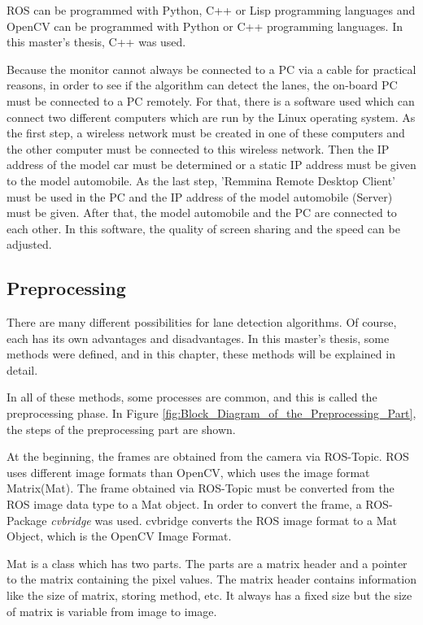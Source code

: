 ROS can be programmed with Python, C++ or Lisp programming languages and OpenCV can be programmed with Python or C++ programming languages. In this master's thesis, C++ was used.

Because the monitor cannot always be connected to a PC via a cable for practical reasons, in order to see if the algorithm can detect the lanes, the on-board PC must be connected to a PC remotely. For that, there is a software used which can connect two different computers which are run by the Linux operating system. As the first step, a wireless network must be created in one of these computers and the other computer must be connected to this wireless network. Then the IP address of the model car must be determined or a static IP address must be given to the model automobile. As the last step, 'Remmina Remote Desktop Client' must be used in the PC and the IP address of the model automobile (Server) must be given. After that, the model automobile and the PC are connected to each other. In this software, the quality of screen sharing and the speed can be adjusted.  

%
\subsection{Preprocessing}\label{sec:Preprocessing}

There are many different possibilities for lane detection algorithms. Of course, each has its own advantages and disadvantages. In this master's thesis, some methods were defined, and in this chapter, these methods will be explained in detail.

In all of these methods, some processes are common, and this is called the preprocessing phase. In Figure \ref{fig:Block_Diagram_of_the_Preprocessing_Part}, the steps of the preprocessing part are shown.

At the beginning, the frames are obtained from the camera via ROS-Topic. ROS uses different image formats than OpenCV, which uses the image format Matrix(Mat). The frame obtained via ROS-Topic must be converted from the ROS image data type to a Mat object. In order to convert the frame, a ROS-Package \textit{cvbridge}\cite{cv_bridge} was used. cvbridge converts the ROS image format to a Mat Object, which is the OpenCV Image Format. 

Mat is a class which has two parts. The parts are a matrix header and a pointer to the matrix containing the pixel values. The matrix header contains information like the size of matrix, storing method, etc. It always has a fixed size but the size of matrix is variable from image to image.

